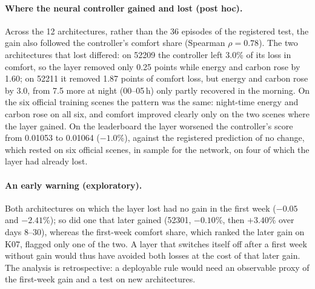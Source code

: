 \paragraph{Where the neural controller gained and lost (post hoc).} Across the 12 architectures, rather than the 36 episodes of the
registered test, the gain also followed the controller's comfort share (Spearman $\rho = 0.78$). The two architectures that lost differed: on 52209 the
controller left 3.0\% of its loss in comfort, so the layer removed only 0.25 points while energy and carbon rose by 1.60;
on 52211 it removed 1.87 points of comfort loss, but energy and carbon rose by 3.0, from 7.5 more at night (00--05\,h)
only partly recovered in the morning. On the six official training scenes the pattern was the same: night-time energy and
carbon rose on all six, and comfort improved clearly only on the two scenes where the layer gained. On the leaderboard the
layer worsened the controller's score from 0.01053 to 0.01064 ($-1.0$\%), against the registered prediction of no change,
which rested on six official scenes, in sample for the network, on four of which the layer had already lost.

\paragraph{An early warning (exploratory).} Both architectures on which the layer lost had no gain in the first week
($-0.05$ and $-2.41$\%); so did one that later gained (52301, $-0.10$\%, then $+3.40$\% over days 8--30), whereas the
first-week comfort share, which ranked the later gain on K07, flagged only one of the two. A layer that switches itself off
after a first week without gain would thus have avoided both losses at the cost of that later gain. The analysis is retrospective: a deployable rule would need an observable proxy of the first-week gain and a test on new
architectures.

